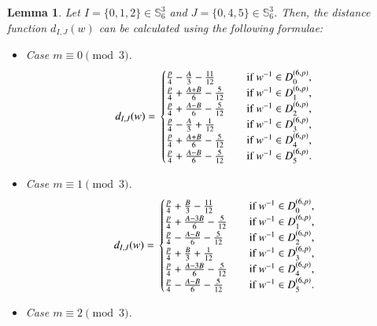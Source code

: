 \documentclass[letter]{ieice}
\newtheorem{sec3_lemma5}[sec3_lemma1]{Lemma}
\begin{document}
\begin{sec3_lemma5}\label{sec3-lamma5-label}
Let $ I=\lbrace0,1,2\rbrace \in  \mathbb{S}_{6}^{3}$ and $ J=\lbrace0,4,5\rbrace \in  \mathbb{S}_{6}^{3}$. Then, the distance function $ d_{I,J}(w) $ can be calculated using the following formulae:
\begin{itemize}
\item Case $ m\equiv 0 \pmod 3 $.
\begin{equation*}
d_{I,J}(w)=\\                  
\begin{cases}
\frac{p}{4}-\frac{A}{3}-\frac{11}{12}&\quad \mbox{if}\ w^{-1} \in  D_{0}^{(6,p)},\\
\frac{p}{4}+\frac{A+B}{6}-\frac{5}{12}&\quad \mbox{if}\ w^{-1} \in  D_{1}^{(6,p)},\\
\frac{p}{4}+\frac{A-B}{6}-\frac{5}{12}&\quad \mbox{if}\ w^{-1} \in  D_{2}^{(6,p)},\\
\frac{p}{4}-\frac{A}{3}+\frac{1}{12}&\quad \mbox{if}\ w^{-1} \in  D_{3}^{(6,p)},\\
\frac{p}{4}+\frac{A+B}{6}-\frac{5}{12}&\quad \mbox{if}\ w^{-1} \in  D_{4}^{(6,p)},\\
\frac{p}{4}+\frac{A-B}{6}-\frac{5}{12}&\quad \mbox{if}\ w^{-1} \in  D_{5}^{(6,p)}.
\end{cases}                      
\end{equation*}
\item Case $ m\equiv 1 \pmod 3 $.
\begin{equation*}
d_{I,J}(w)=\\                  
\begin{cases}
\frac{p}{4}+\frac{B}{3}-\frac{11}{12}&\quad \mbox{if}\ w^{-1} \in  D_{0}^{(6,p)},\\
\frac{p}{4}+\frac{A-3B}{6}-\frac{5}{12}&\quad \mbox{if}\ w^{-1} \in  D_{1}^{(6,p)},\\
\frac{p}{4}-\frac{A-B}{6}-\frac{5}{12}&\quad \mbox{if}\ w^{-1} \in  D_{2}^{(6,p)},\\
\frac{p}{4}+\frac{B}{3}+\frac{1}{12}&\quad \mbox{if}\ w^{-1} \in  D_{3}^{(6,p)},\\
\frac{p}{4}+\frac{A-3B}{6}-\frac{5}{12}&\quad \mbox{if}\ w^{-1} \in  D_{4}^{(6,p)},\\
\frac{p}{4}-\frac{A-B}{6}-\frac{5}{12}&\quad \mbox{if}\ w^{-1} \in  D_{5}^{(6,p)}.
\end{cases}                               
\end{equation*}
\item Case $ m\equiv 2 \pmod 3 $.

\end{itemize}
\end{sec3_lemma5}
\end{document}

